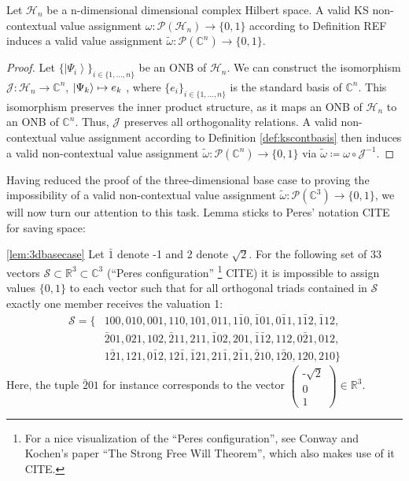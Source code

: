 \begin{lemma}
Let $\mathcal{H}_{n}$ be a n-dimensional dimensional complex Hilbert space. A valid KS non-contextual value assignment $\omega:\mathcal{P}(\mathcal{H}_{n})\rightarrow\{0,1\}$ according to Definition REF induces a valid value assignment $\tilde{\omega}:\mathcal{P}(\mathbb{C}^{n})\rightarrow\{0,1\}$.
\end{lemma}

\begin{proof}
Let $\{\left|\Psi_{i}\right\rangle \}_{i\in\{1,\dots,n\}}$ be an ONB of $\mathcal{H}_{n}$. We can construct the isomorphism $\mathcal{J}:\mathcal{\mathcal{H}}_{n}\rightarrow\mathbb{C}^{n}$, $\ket{\Psi_{k}} \mapsto e_{k}$ , where $\{e_{i}\}_{i\in\{1,\dots,n\}}$ is the standard basis of $\mathbb{C}^{n}$. This isomorphism preserves the inner product structure, as it maps an ONB of $\mathcal{H}_{n}$ to an ONB of $\mathbb{C}^{n}$. Thus, $\mathcal{J}$ preserves all orthogonality relations. A valid non-contextual value assignment according to Definition \ref{def:kscontbasis} then induces a valid non-contextual value assignment $\tilde{\omega}:\mathcal{P}(\mathbb{C}^{n})\rightarrow\{0,1\}$ via $\tilde{\omega}\coloneqq\omega\circ\mathcal{J}^{-1}$.
\end{proof}

Having reduced the proof of the three-dimensional base case to proving the impossibility of a valid non-contextual value assignment $\tilde{\omega}:\mathcal{P}(\mathbb{C}^{3})\rightarrow\{0,1\}$, we will now turn our attention to this task. Lemma \label{lem:3dbasecase} sticks to Peres' notation CITE for saving space:

\begin{lemma}
\ref{lem:3dbasecase}
Let $\bar{1}$ denote -1 and 2 denote $\sqrt{2}$. For the following set of 33 vectors $\mathcal{S}\subset\mathbb{R}^{3}\subset\mathbb{C}^{3}$ (“Peres configuration” \footnote{For a nice visualization of the “Peres configuration”, see Conway and Kochen's paper “The Strong Free Will Theorem”, which also makes use of it CITE.} CITE) it is impossible to assign values $\{0,1\}$ to each vector such that for all orthogonal triads contained in $\mathcal{S}$ exactly one member receives the valuation 1:
\begin{equation*}
\begin{split}
\mathcal{S}= \{ & 100,010,001,110,101,011,1\bar{1}0,\bar{1}01,0\bar{1}1,1\bar{1}2,\bar{1}12, \\
& \bar{2}01,021,102,\bar{2}11,211,\bar{1}02,201,\bar{1}\bar{1}2,112,0\bar{2}1,012, \\
& 1\bar{2}1,121,0\bar{1}2,12\bar{1},\bar{1}21,21\bar{1},2\bar{1}1,\bar{2}10,1\bar{2}0,120,210\} 
\end{split}
\end{equation*}
Here, the tuple $\bar{2}01$ for instance corresponds to the vector 
$\begin{pmatrix}
\text{-}\sqrt{2}\\
0\\
1
\end{pmatrix}\in\mathbb{R}^{3}.$
\end{lemma}

